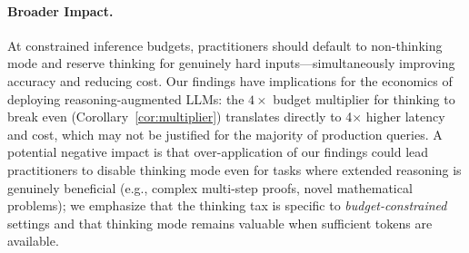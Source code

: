 \paragraph{Broader Impact.}
At constrained inference budgets, practitioners should default to non-thinking mode and reserve thinking for genuinely hard inputs---simultaneously improving accuracy and reducing cost.
Our findings have implications for the economics of deploying reasoning-augmented LLMs: the $4\times$ budget multiplier for thinking to break even (Corollary~\ref{cor:multiplier}) translates directly to 4$\times$ higher latency and cost, which may not be justified for the majority of production queries.
A potential negative impact is that over-application of our findings could lead practitioners to disable thinking mode even for tasks where extended reasoning is genuinely beneficial (e.g., complex multi-step proofs, novel mathematical problems); we emphasize that the thinking tax is specific to \emph{budget-constrained} settings and that thinking mode remains valuable when sufficient tokens are available.

